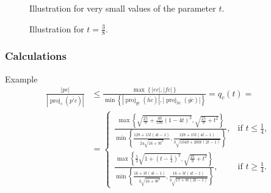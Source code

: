 \documentclass{beamer}
\newcommand{\vertwopartdef}[4]
{
	\left\{
		\begin{array}{ll}
			#1 & \mbox{if } #2 \\[22pt]
			#3 & \mbox{if } #4
		\end{array}
	\right.
}
\DeclareMathOperator{\proj}{proj}
\begin{document}
\begin{frame}
\begin{figure}[!ht]
\begin{center}
\resizebox{4cm}{!}{%

}
\end{center}
\caption{Illustration for very small values of the parameter $t$.}
\end{figure}
\end{frame}


\begin{frame}
\begin{figure}[!ht]
\begin{center}
\resizebox{4cm}{!}{%

}
\end{center}
\caption{Illustration for $t = \frac{3}{8}$.}
\end{figure}
\end{frame}


\begin{frame}
\frametitle{Calculations}
\begin{block}{Example}
\begin{align*}
\frac{\left|pc\right|}{\left|\proj_{s} \left(\overline{p'c}\right)\right|} &\leq
\frac{\max\left\{ \left|ec\right|, \left|fc\right| \right\}}{\min
\left\{
\left|\proj_{\overline{gc}} \left(\overline{hc}\right)\right|,
\left|\proj_{\overline{hc}} \left(\overline{gc}\right)\right|
\right\}
} = q_{c}(t) = \\[6pt]%
&= \vertwopartdef 
{
\frac{
\max
\left\{ \sqrt{\frac{25}{9} + \frac{49}{576}\left(1-4t\right)^{2}}, \sqrt{\frac{25}{9}+t^{2}} \right\}
}{
\min
\left\{ \frac{128 + 15t(4t-1)}{24 \sqrt{16+9t^{2}}}, 
\frac{128 + 15t(4t-1)}{3 \sqrt{1049+200t(2t-1)}} \right\}}, } {t \leq \frac{1}{4},} 
{
\frac{
\max
\left\{ \frac{5}{3} \sqrt{1 + \left(t - \frac{1}{4}\right)^{2}}, \sqrt{\frac{25}{9}+t^{2}} \right\}
}{
\min
\left\{ \frac{16 + 3t(4t-1)}{3 \sqrt{16+9t^{2}}}, 
\frac{16 + 3t(4t-1)}{3 \sqrt{17 + 8t(2t-1)}} \right\}}, } {t \geq \frac{1}{4}.} \\[6pt]%
\end{align*}
\end{block}
\end{frame}
\end{document}
